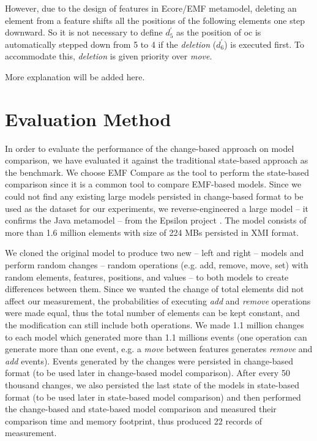 \documentclass{llncs}
\begin{document}
However, due to the design of features in Ecore/EMF metamodel, deleting an element from a feature shifts all the positions of the following elements one step downward. So it is not necessary to define $d_5^\prime$ as the position of \textsf{oc} is automatically stepped down from 5 to 4 if the \textit{deletion} ($d_6^\prime$) is executed first. To accommodate this, \textit{deletion} is given priority over \textit{move}. 

More explanation will be added here.

\section{Evaluation Method}
\label{sec:evaluation}

In order to evaluate the performance of the change-based approach on model comparison, we have evaluated it against the traditional state-based approach as the benchmark. We choose EMF Compare \cite{emfcompare2018developer,eclipse2017compare} as the tool to perform the state-based comparison since it is a common tool to compare EMF-based models. Since we could not find any existing large models persisted in change-based format to be used as the dataset for our experiments, we reverse-engineered a large model -- it confirms the Java metamodel \cite{eclipse2018modiscojava} -- from the Epsilon project \cite{eclipse2018epsilongit,eclipse2017epsilon}. The model consists of more than 1.6 million elements with size of 224 MBs persisted in XMI format. 

We cloned the original model to produce two new -- left and right -- models and perform random changes -- random operations (e.g. add, remove, move, set) with random elements, features, positions, and values -- to both models to create differences between them. Since we wanted the change of total elements did not affect our measurement, the probabilities of executing \textit{add} and \textit{remove} operations were made equal, thus the total number of elements can be kept constant, and the modification can still include both operations. We made 1.1 million changes to each model which generated more than 1.1 millions events (one operation can generate more than one event, e.g. a \textit{move} between features generates \textit{remove} and \textit{add} events). Events generated by the changes were persisted in change-based format (to be used later in change-based model comparison). After every 50 thousand changes, we also persisted the last state of the models in state-based format (to be used later in state-based model comparison) and then performed the change-based and state-based model comparison and measured their comparison time and memory footprint, thus produced 22 records of measurement. 
\end{document}
